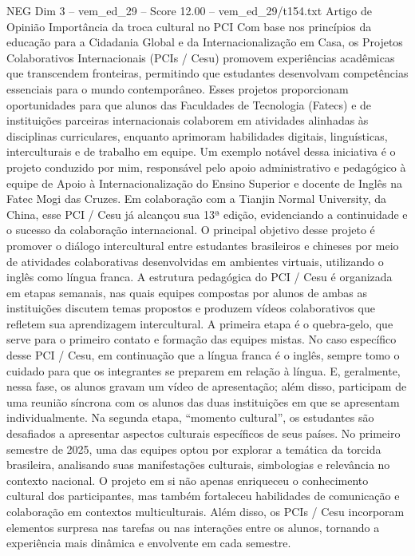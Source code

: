 \begin{textsample}{NEG Dim 3 – vem\_ed\_29 – Score 12.00 – vem\_ed\_29/t154.txt}  \label{ex:f3_neg_174}
Artigo de Opinião Importância da troca cultural no PCI Com base nos princípios da educação para a Cidadania Global e da Internacionalização em Casa, os Projetos Colaborativos Internacionais (PCIs / Cesu) promovem experiências acadêmicas que transcendem fronteiras, permitindo que estudantes desenvolvam competências essenciais para o mundo contemporâneo.
Esses projetos proporcionam oportunidades para que alunos das Faculdades de Tecnologia (Fatecs) e de instituições parceiras internacionais colaborem em atividades alinhadas às disciplinas curriculares, enquanto aprimoram habilidades digitais, linguísticas, interculturais e de trabalho em equipe.
Um exemplo notável dessa iniciativa é o projeto conduzido por mim, responsável pelo apoio administrativo e pedagógico à equipe de Apoio à Internacionalização do Ensino Superior e docente de Inglês na Fatec Mogi das Cruzes.
Em colaboração com a Tianjin Normal University, da China, esse PCI / Cesu já alcançou sua 13ª edição, evidenciando a continuidade e o sucesso da colaboração internacional.
O principal objetivo desse projeto é promover o diálogo intercultural entre estudantes brasileiros e chineses por meio de atividades colaborativas desenvolvidas em ambientes virtuais, utilizando o inglês como língua franca.
A estrutura pedagógica do PCI / Cesu é organizada em etapas semanais, nas quais equipes compostas por alunos de ambas as instituições discutem temas propostos e produzem vídeos colaborativos que refletem sua aprendizagem intercultural.
A primeira etapa é o quebra-gelo, que serve para o primeiro contato e formação das equipes mistas.
No caso específico desse PCI / Cesu, em continuação que a língua franca é o inglês, sempre tomo o cuidado para que os integrantes se preparem em relação à língua.
E, geralmente, nessa fase, os alunos gravam um vídeo de apresentação; além disso, participam de uma reunião síncrona com os alunos das duas instituições em que se apresentam individualmente.
Na segunda etapa, “momento cultural”, os estudantes são desafiados a apresentar aspectos culturais específicos de seus países.
No primeiro semestre de 2025, uma das equipes optou por explorar a temática da torcida brasileira, analisando suas manifestações culturais, simbologias e relevância no contexto nacional.
O projeto em si não apenas enriqueceu o conhecimento cultural dos participantes, mas também fortaleceu habilidades de comunicação e colaboração em contextos multiculturais.
Além disso, os PCIs / Cesu incorporam elementos surpresa nas tarefas ou nas interações entre os alunos, tornando a experiência mais dinâmica e envolvente em cada semestre.

\end{textsample}
